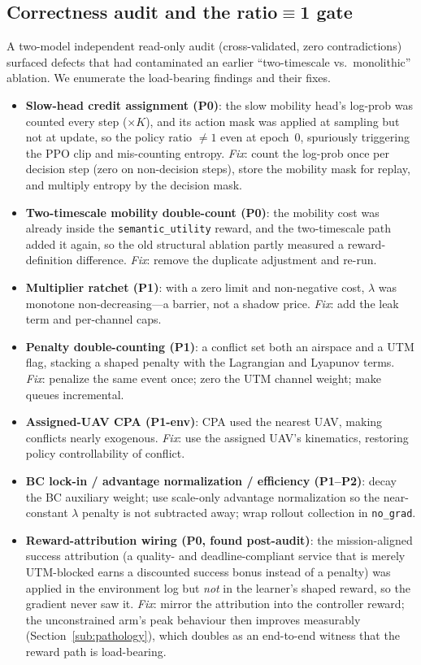\subsection{Correctness audit and the ratio$\equiv$1 gate}\label{sub:fixes}
A two-model independent read-only audit (cross-validated, zero
contradictions) surfaced defects that had contaminated an earlier
``two-timescale vs.\ monolithic'' ablation. We enumerate the load-bearing
findings and their fixes.
\begin{itemize}
\item \textbf{Slow-head credit assignment (P0)}: the slow mobility head's
log-prob was counted every step ($\times K$), and its action mask was
applied at sampling but not at update, so the policy ratio $\neq1$ even at
epoch~0, spuriously triggering the PPO clip and mis-counting entropy.
\emph{Fix}: count the log-prob once per decision step (zero on
non-decision steps), store the mobility mask for replay, and multiply
entropy by the decision mask.
\item \textbf{Two-timescale mobility double-count (P0)}: the mobility cost
was already inside the \texttt{semantic\_utility} reward, and the
two-timescale path added it again, so the old structural ablation partly
measured a reward-definition difference. \emph{Fix}: remove the duplicate
adjustment and re-run.
\item \textbf{Multiplier ratchet (P1)}: with a zero limit and non-negative
cost, $\lambda$ was monotone non-decreasing---a barrier, not a shadow
price. \emph{Fix}: add the leak term and per-channel caps.
\item \textbf{Penalty double-counting (P1)}: a conflict set both an
airspace and a UTM flag, stacking a shaped penalty with the Lagrangian and
Lyapunov terms. \emph{Fix}: penalize the same event once; zero the UTM
channel weight; make queues incremental.
\item \textbf{Assigned-UAV CPA (P1-env)}: CPA used the nearest UAV, making
conflicts nearly exogenous. \emph{Fix}: use the assigned UAV's kinematics,
restoring policy controllability of conflict.
\item \textbf{BC lock-in / advantage normalization / efficiency (P1--P2)}:
decay the BC auxiliary weight; use scale-only advantage normalization so
the near-constant $\lambda$ penalty is not subtracted away; wrap rollout
collection in \texttt{no\_grad}.
\item \textbf{Reward-attribution wiring (P0, found post-audit)}: the
mission-aligned success attribution (a quality- and deadline-compliant
service that is merely UTM-blocked earns a discounted success bonus
instead of a penalty) was applied in the environment log but \emph{not} in
the learner's shaped reward, so the gradient never saw it. \emph{Fix}:
mirror the attribution into the controller reward; the unconstrained arm's
peak behaviour then improves measurably
(Section~\ref{sub:pathology}), which doubles as an end-to-end witness that
the reward path is load-bearing.
\end{itemize}
